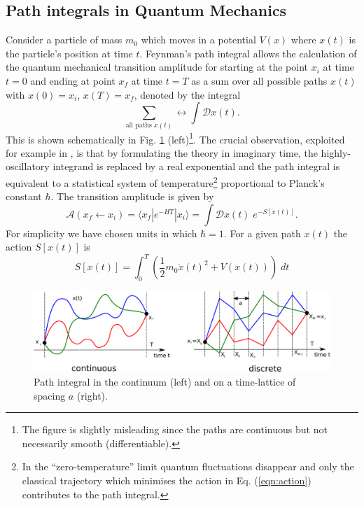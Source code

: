 \documentclass[11pt]{article}
\begin{document}
\subsection{Path integrals in Quantum Mechanics}
Consider a particle of mass $m_0$ which moves in a potential $V(x)$ where $x(t)$ is the particle's position at time $t$.
Feynman's path integral \cite{Feynman2010} allows the calculation of the quantum mechanical transition amplitude for starting at the point $x_i$ at time $t=0$ and ending at point $x_f$ at time $t=T$ as a sum over all possible paths $x(t)$ with $x(0)=x_i$,  $x(T)=x_f$, denoted by the integral
\begin{equation} 
\sum_{\text{all paths $x(t)$}}\leftrightarrow  \int \mathcal{D}x(t).
\end{equation}
This is shown schematically in Fig. \ref{fig:path_integral} (left)\footnote{The figure is slightly misleading since the paths are continuous but not necessarily smooth (differentiable).}. The crucial observation, exploited for example in \cite{Creutz1981}, is that by formulating the theory in imaginary time, the highly-oscillatory integrand is replaced by a real exponential and the path integral is equivalent to a statistical system of temperature\footnote{In the ``zero-temperature'' limit quantum fluctuations disappear and only the classical trajectory which minimises the action in Eq. (\ref{eqn:action}) contributes to the path integral.} proportional to Planck's constant $\hbar$.  The transition amplitude is given by
\begin{equation}
  \mathcal{A}(x_f\leftarrow x_i)=\langle x_f| e^{-HT} |x_i\rangle = \int\mathcal{D}x(t)\;e^{-S[x(t)]}.\label{eqn:path_integral_continuum}
\end{equation}
For simplicity we have chosen units in which $\hbar=1$.
For a given path $x(t)$ the action $S[x(t)]$ is
\begin{equation}
  S[x(t)] = \int_{0}^{T} \left(\frac{1}{2}m_0 \dot{x}(t)^2 + V(x(t))\right)\;dt\label{eqn:action}
\end{equation}
\begin{figure}
  \begin{center}
    \includegraphics[width=\linewidth]{path_integral.pdf}
    \caption{Path integral in the continuum (left) and on a time-lattice of spacing $a$ (right).}
    \label{fig:path_integral}
  \end{center}
\end{figure}
\end{document}
